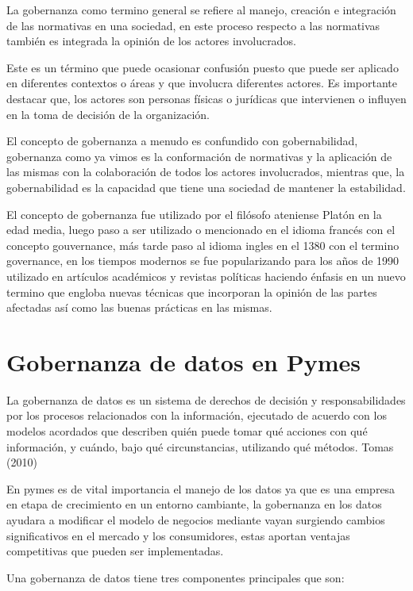 \documentclass[
  letterpaper,
  DIV=11,
  numbers=noendperiod]{scrreprt}
\begin{document}
La gobernanza como termino general se refiere al manejo, creación e
integración de las normativas en una sociedad, en este proceso respecto
a las normativas también es integrada la opinión de los actores
involucrados.

Este es un término que puede ocasionar confusión puesto que puede ser
aplicado en diferentes contextos o áreas y que involucra diferentes
actores. Es importante destacar que, los actores son personas físicas o
jurídicas que intervienen o influyen en la toma de decisión de la
organización.

El concepto de gobernanza a menudo es confundido con gobernabilidad,
gobernanza como ya vimos es la conformación de normativas y la
aplicación de las mismas con la colaboración de todos los actores
involucrados, mientras que, la gobernabilidad es la capacidad que tiene
una sociedad de mantener la estabilidad.

El concepto de gobernanza fue utilizado por el filósofo ateniense Platón
en la edad media, luego paso a ser utilizado o mencionado en el idioma
francés con el concepto gouvernance, más tarde paso al idioma ingles en
el 1380 con el termino governance, en los tiempos modernos se fue
popularizando para los años de 1990 utilizado en artículos académicos y
revistas políticas haciendo énfasis en un nuevo termino que engloba
nuevas técnicas que incorporan la opinión de las partes afectadas así
como las buenas prácticas en las mismas.

\hypertarget{gobernanza-de-datos-en-pymes}{%
\section{Gobernanza de datos en
Pymes}\label{gobernanza-de-datos-en-pymes}}

La gobernanza de datos es un sistema de derechos de decisión y
responsabilidades por los procesos relacionados con la información,
ejecutado de acuerdo con los modelos acordados que describen quién puede
tomar qué acciones con qué información, y cuándo, bajo qué
circunstancias, utilizando qué métodos. Tomas (2010)

En pymes es de vital importancia el manejo de los datos ya que es una
empresa en etapa de crecimiento en un entorno cambiante, la gobernanza
en los datos ayudara a modificar el modelo de negocios mediante vayan
surgiendo cambios significativos en el mercado y los consumidores, estas
aportan ventajas competitivas que pueden ser implementadas.

Una gobernanza de datos tiene tres componentes principales que son:
\end{document}
